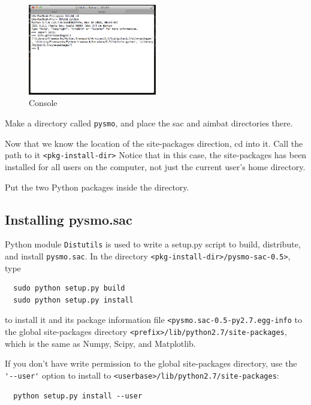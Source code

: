 \documentclass[letterpaper,10pt]{article}
\begin{document}
\begin{figure}[h!]
  \centering
  \includegraphics[width=0.5\textwidth]{images/site_package_location}
  \caption{Console}
  \label{fig:site_package_location}
\end{figure}

Make a directory called \verb"pysmo", and place the sac and aimbat directories there. 

Now that we know the location of the site-packages direction, cd into it. Call the path to it \verb"<pkg-install-dir>" Notice that in this case, the site-packages has been installed for all users on the computer, not just the current user's home directory. 

Put the two Python packages inside the directory.


\subsection{Installing pysmo.sac}

Python module \verb"Distutils" is used to write a setup.py script to build, distribute, and install \verb"pysmo.sac". In the directory \verb"<pkg-install-dir>/pysmo-sac-0.5>", type 

\begin{verbatim}
  sudo python setup.py build
  sudo python setup.py install
\end{verbatim}

to install it and its package information file \verb"<pysmo.sac-0.5-py2.7.egg-info" to the global site-packages directory \verb"<prefix>/lib/python2.7/site-packages", which is the same as Numpy, Scipy, and Matplotlib.

If you don't have write permission to the global site-packages directory, use the \verb"'--user'" option to install to \verb"<userbase>/lib/python2.7/site-packages":

\begin{verbatim}
  python setup.py install --user
\end{verbatim}
\end{document}
